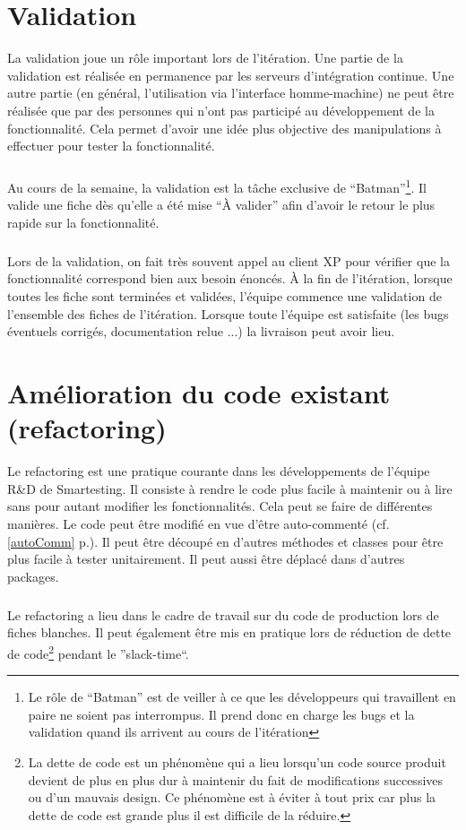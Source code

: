 \section{Validation}
La validation joue un rôle important lors de l'itération. Une partie de la validation est réalisée en permanence par les serveurs d'intégration continue. Une autre partie (en général, l'utilisation via l'interface homme-machine) ne peut être réalisée que par des personnes qui n'ont pas participé au développement de la fonctionnalité. Cela permet d'avoir une idée plus objective des manipulations à effectuer pour tester la fonctionnalité.
\subparagraph*{}
Au cours de la semaine, la validation est la tâche exclusive de ``Batman''\footnote{Le rôle de ``Batman'' est de veiller à ce que les développeurs qui travaillent en paire ne soient pas interrompus. Il prend donc en charge les bugs et la validation quand ils arrivent au cours de l'itération}. Il valide une fiche dès qu'elle a été mise ``À valider'' afin d'avoir le retour le plus rapide sur la fonctionnalité.
\subparagraph*{}
Lors de la validation, on fait très souvent appel au client XP pour vérifier que la fonctionnalité correspond bien aux besoin énoncés. À la fin de l'itération, lorsque toutes les fiche sont terminées et validées, l'équipe commence une validation de l'ensemble des fiches de l'itération. Lorsque toute l'équipe est satisfaite (les bugs éventuels corrigés, documentation relue ...) la livraison peut avoir lieu.
\section{Amélioration du code existant (refactoring)}
Le refactoring est une pratique courante dans les développements de l'équipe R\&D de Smartesting. Il consiste à rendre le code plus facile à maintenir ou à lire sans pour autant modifier les fonctionnalités. Cela peut se faire de différentes manières. Le code peut être modifié en vue d'être auto-commenté (cf. \ref{autoComm} p.\pageref{autoComm}). Il peut être découpé en d'autres méthodes et classes pour être plus facile à tester unitairement. Il peut aussi être déplacé dans d'autres packages.
\subparagraph*{}
Le refactoring a lieu dans le cadre de travail sur du code de production lors de fiches blanches. Il peut également être mis en pratique lors de réduction de dette de code\footnote{La dette de code est un phénomène qui a lieu lorsqu'un code source produit devient de plus en plus dur à maintenir du fait de modifications successives ou d'un mauvais design. Ce phénomène est à éviter à tout prix car plus la dette de code est grande plus il est difficile de la réduire.} pendant le ''slack-time``.
